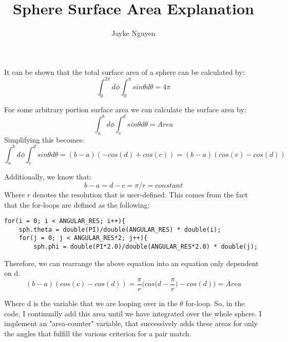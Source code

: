 \documentclass{article}
\begin{document}
\title{Sphere Surface Area Explanation}
\author{Jayke Nguyen}
\maketitle
It can be shown that the total surface area of a sphere can be calculated by:
$$\int_{0}^{2\pi} d\phi \int_{0}^{\pi} sin\theta d\theta = 4\pi $$

For some arbitrary portion surface area we can calculate the surface area by: 
$$\int_{a}^{b} d\phi \int_{c}^{d} sin\theta d\theta = Area $$
Simplifying this becomes:
$$\int_{a}^{b} d\phi \int_{c}^{d} sin\theta d\theta = (b-a)(-cos(d)+cos(c)) = (b-a) (cos(c)-cos(d))$$

Additionally, we know that:
$$ b-a = d-c = \pi/r = constant $$
Where $r$ denotes the resolution that is user-defined. This comes from the fact that the for-loops are defined as the following:

\begin{verbatim}
for(i = 0; i < ANGULAR_RES; i++){
    sph.theta = double(PI)/double(ANGULAR_RES) * double(i);
    for(j = 0; j < ANGULAR_RES*2; j++){
        sph.phi = double(PI*2.0)/double(ANGULAR_RES*2.0) * double(j);
\end{verbatim}

Therefore, we can rearrange the above equation into an equation only dependent on d.
$$ (b-a) (cos(c)-cos(d)) = \frac{\pi}{r} \Bigg(cos\Big(d-\frac{\pi}{r}\Big) - cos(d)\Bigg) = Area$$

Where d is the variable that we are looping over in the $\theta$ for-loop.
So, in the code, I continually add this area until we have integrated over the whole sphere. I implement an "area-counter" variable, that successively adds these areas for only the angles that fulfill the various criterion for a pair match.
\end{document}
